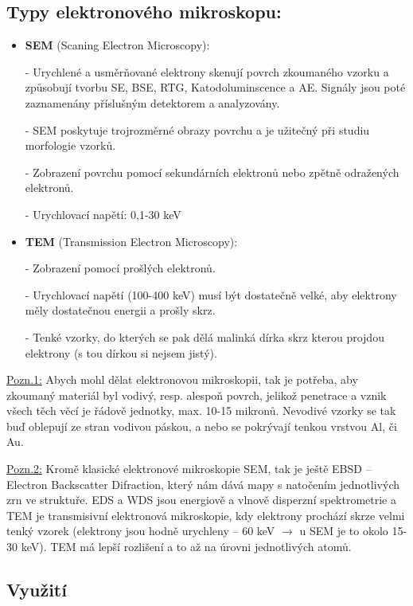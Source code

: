 \subsection{Typy elektronového mikroskopu:}

\begin{itemize}
    \item \textbf{SEM} (Scaning Electron Microscopy):
    \item[-] Urychlené a usměrňované elektrony skenují povrch zkoumaného vzorku a způsobují tvorbu SE, BSE, RTG, Katodoluminscence a AE. Signály jsou poté zaznamenány příslušným detektorem a analyzovány.
    \item[-] SEM poskytuje trojrozměrné obrazy povrchu a je užitečný při studiu morfologie vzorků.
    \item[-] Zobrazení povrchu pomocí sekundárních elektronů nebo zpětně odražených elektronů.
    \item[-] Urychlovací napětí: 0,1-30 keV
    \item \textbf{TEM} (Transmission Electron Microscopy):
    \item[-] Zobrazení pomocí prošlých elektronů.
	\item[-] Urychlovací napětí (100-400 keV) musí být dostatečně velké, aby elektrony měly dostatečnou energii a prošly skrz.
    \item[-] Tenké vzorky, do kterých se pak dělá malinká dírka skrz kterou projdou elektrony (s tou dírkou si nejsem jistý). 
\end{itemize}

\underline{Pozn.1:} Abych mohl dělat elektronovou mikroskopii, tak je potřeba, aby zkoumaný materiál byl vodivý, resp. alespoň povrch, jelikož penetrace a vznik všech těch věcí je řádově jednotky, max. 10-15 mikronů. Nevodivé vzorky se tak buď oblepují ze stran vodivou páskou, a nebo se pokrývají tenkou vrstvou Al, či Au.

\underline{Pozn.2:} Kromě klasické elektronové mikroskopie SEM, tak je ještě EBSD -- Electron Backscatter Difraction, který nám dává mapy s natočením jednotlivých zrn ve struktuře. EDS a WDS jsou energiově a vlnově disperzní spektrometrie a TEM je transmisivní elektronová mikroskopie, kdy elektrony prochází skrze velmi tenký vzorek (elektrony jsou hodně urychleny -- 60 keV $\rightarrow$ u SEM je to okolo 15-30 keV). TEM má lepší rozlišení a to až na úrovni jednotlivých atomů.

\subsection{Využití}

